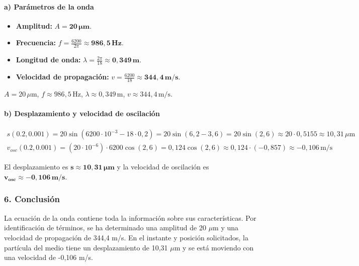 \paragraph*{a) Parámetros de la onda}
\begin{itemize}
    \item \textbf{Amplitud:} $A = \boldsymbol{20 \, \mu\textbf{m}}$.
    \item \textbf{Frecuencia:} $f = \frac{6200}{2\pi} \approx \boldsymbol{986,5 \, \textbf{Hz}}$.
    \item \textbf{Longitud de onda:} $\lambda = \frac{2\pi}{18} \approx \boldsymbol{0,349 \, \textbf{m}}$.
    \item \textbf{Velocidad de propagación:} $v = \frac{6200}{18} \approx \boldsymbol{344,4 \, \textbf{m/s}}$.
\end{itemize}
\begin{cajaresultado}
$A=20\,\mu\text{m}$, $f\approx986,5\,\text{Hz}$, $\lambda\approx0,349\,\text{m}$, $v\approx344,4\,\text{m/s}$.
\end{cajaresultado}

\paragraph*{b) Desplazamiento y velocidad de oscilación}
\begin{gather}
    s(0.2, 0.001) = 20\sin(6200 \cdot 10^{-3} - 18 \cdot 0,2) = 20\sin(6,2 - 3,6) = 20\sin(2,6) \approx 20 \cdot 0,5155 \approx 10,31 \, \mu\text{m} \\
    v_{osc}(0.2, 0.001) = (20 \cdot 10^{-6}) \cdot 6200 \cos(2,6) = 0,124 \cos(2,6) \approx 0,124 \cdot (-0,857) \approx -0,106 \, \text{m/s}
\end{gather}
\begin{cajaresultado}
El desplazamiento es $\boldsymbol{s \approx 10,31 \, \mu\textbf{m}}$ y la velocidad de oscilación es $\boldsymbol{v_{osc} \approx -0,106 \, \textbf{m/s}}$.
\end{cajaresultado}

\subsubsection*{6. Conclusión}
\begin{cajaconclusion}
La ecuación de la onda contiene toda la información sobre sus características. Por identificación de términos, se ha determinado una amplitud de 20 $\mu$m y una velocidad de propagación de 344,4 m/s. En el instante y posición solicitados, la partícula del medio tiene un desplazamiento de 10,31 $\mu$m y se está moviendo con una velocidad de -0,106 m/s.
\end{cajaconclusion}

